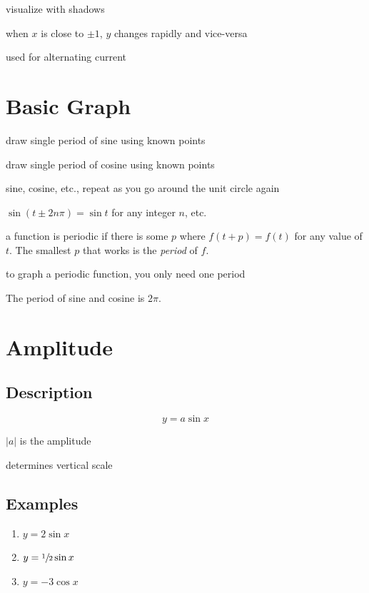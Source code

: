 \documentclass{exam}
\begin{document}
  \begin{itemize*}
    \item visualize with shadows
    \item when $x$ is close to $\pm 1$, $y$ changes rapidly and vice-versa
    \item used for alternating current
  \end{itemize*}


  \section{Basic Graph}
  \begin{itemize*}
    \item draw single period of sine using known points
    \item draw single period of cosine using known points
  \end{itemize*}

  \begin{itemize*}
    \item sine, cosine, etc., repeat as you go around the unit circle again
    \item $\sin(t \pm 2n \pi) = \sin t$ for any integer $n$, etc.
    \item a function is periodic if there is some $p$ where $f(t + p) = f(t)$ for any value of $t$.  The smallest
      $p$ that works is the {\em period} of $f$.
    \item to graph a periodic function, you only need one period
    \item The period of sine and cosine is $2 \pi$.  
  \end{itemize*}

  \section{Amplitude}
  \subsection{Description}
  \[
    y = a \sin x
  \]

  \begin{itemize*}
    \item $|a|$ is the amplitude
    \item determines vertical scale
  \end{itemize*}

  \subsection{Examples}
  \begin{enumerate}
    \item $y = 2 \sin x$
    \item $y = \sfrac{1}{2} \sin x$
    \item $y = -3 \cos x$
  \end{enumerate}
\end{document}
